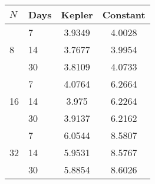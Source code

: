 \begin{tabular}{l|lcc}
\hline
$N$ & Days & Kepler & Constant \\
\hline
\multirow{3}{*}{8} & 7 & 3.9349 & 4.0028 \\ 
&14 & 3.7677 & 3.9954 \\ 
&30 & 3.8109 & 4.0733 \\  \hline
\multirow{3}{*}{16} & 7 & 4.0764 & 6.2664 \\ 
&14 & 3.975 & 6.2264 \\ 
&30 & 3.9137 & 6.2162 \\ \hline
\multirow{3}{*}{32} & 7 & 6.0544 & 8.5807 \\ 
&14 & 5.9531 & 8.5767 \\ 
&30 & 5.8854 & 8.6026 \\  \hline
\end{tabular}

